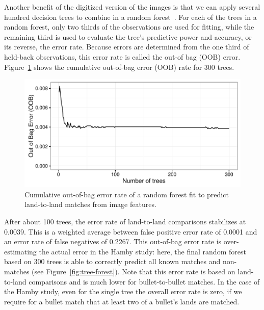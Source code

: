 \documentclass[aoas, preprint]{imsart}\usepackage[]{graphicx}\usepackage[]{color}
\newenvironment{knitrout}{}{} %
\begin{document}
Another benefit of the digitized version of the images is that we can apply several hundred decision trees to combine in a random forest~\citep{breiman:2001, randomForest}.  For each of the trees in a random forest, only two thirds of the observations are used for fitting, while  the remaining third is used to evaluate the tree's predictive power and accuracy, or its reverse, the error rate. Because errors are determined from the one third of held-back observations, this error rate is called the out-of bag (OOB) error. 
Figure~\ref{fig:oob} shows the cumulative out-of-bag error (OOB) rate for 300 trees. 
%
\begin{figure}[hbtp]
  \centering
\begin{knitrout}
\color{fgcolor}
\includegraphics[width=.7\textwidth]{oob-1} 

\end{knitrout}
\caption{\label{fig:oob}Cumulative out-of-bag error rate of a random forest fit to predict land-to-land matches from image features.}
\end{figure}
%
After about 100 trees, the error rate of land-to-land comparisons stabilizes at 0.0039. This is a weighted average between false positive error rate of 0.0001 and an error rate of false negatives of 0.2267. This out-of-bag error rate is over-estimating the actual error in the Hamby study: here, the final random forest based on 300 trees is able to correctly predict all known  matches and non-matches (see Figure~\ref{fig:tree-forest}).
Note that this error rate is based on land-to-land comparisons and is much lower for bullet-to-bullet matches. In the case of the Hamby study, even for the single tree the overall error rate is zero, if we require for a bullet match that at least two of a bullet's lands are matched. %
\end{document}
